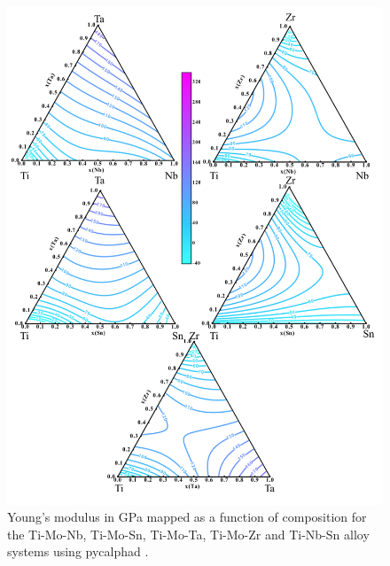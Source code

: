 \pagebreak
\begin{figure}[H]
	\centering
	\includegraphics[width=\textwidth]{Chapter-6/Figures/tixymap2.png}
	\caption{Young's modulus in GPa mapped as a function of composition for the Ti-Mo-Nb, Ti-Mo-Sn, Ti-Mo-Ta, Ti-Mo-Zr and Ti-Nb-Sn alloy systems using pycalphad \cite{Otis2017}.}
	\label{Ch6-figure:tixymap2}
\end{figure}

